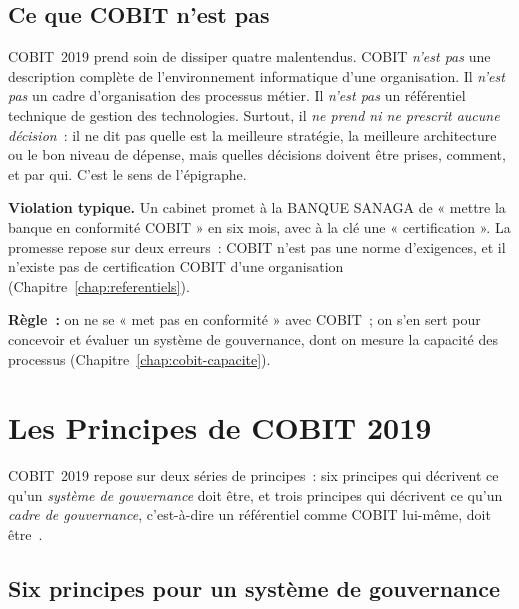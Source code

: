 \subsection{Ce que COBIT n'est pas}

COBIT~2019 prend soin de dissiper quatre malentendus. COBIT \emph{n'est
pas} une description complète de l'environnement informatique d'une
organisation. Il \emph{n'est pas} un cadre d'organisation des processus
métier. Il \emph{n'est pas} un référentiel technique de gestion des
technologies. Surtout, il \emph{ne prend ni ne prescrit aucune décision}~:
il ne dit pas quelle est la meilleure stratégie, la meilleure architecture
ou le bon niveau de dépense, mais quelles décisions doivent être prises,
comment, et par qui. C'est le sens de l'épigraphe.

\begin{boxalert}
\textbf{Violation typique.} Un cabinet promet à la BANQUE SANAGA de
« mettre la banque en conformité COBIT » en six mois, avec à la clé une
« certification ». La promesse repose sur deux erreurs~: COBIT n'est pas
une norme d'exigences, et il n'existe pas de certification COBIT d'une
organisation (Chapitre~\ref{chap:referentiels}).

\smallskip
\textbf{Règle~:} on ne se « met pas en conformité » avec COBIT~; on s'en
sert pour concevoir et évaluer un système de gouvernance, dont on mesure
la capacité des processus (Chapitre~\ref{chap:cobit-capacite}).
\end{boxalert}

\section{Les Principes de COBIT 2019}
\label{sec:c05-principes}

COBIT~2019 repose sur deux séries de principes~: six principes qui
décrivent ce qu'un \emph{système de gouvernance} doit être, et trois
principes qui décrivent ce qu'un \emph{cadre de gouvernance}, c'est-à-dire
un référentiel comme COBIT lui-même, doit être~\cite{isaca2018cobitintro}.

\subsection{Six principes pour un système de gouvernance}

